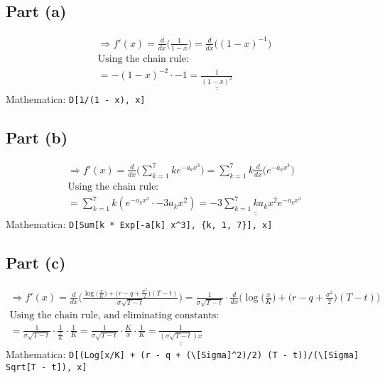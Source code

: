 \documentclass[letterpaper,10pt]{article}
\newcommand{\doubleu}[1]{\underline{\underline{#1}}}
\newcommand{\ddx}[1]{\frac{d}{dx} \bigg( #1 \bigg)}
\newcommand{\mathematica}[1]{Mathematica: \texttt{#1}}
\begin{document}
		\subsection{Part (a)}
			\begin{gather*}
				\Rightarrow f'(x) = \ddx{\frac{1}{1-x}}
				= \ddx{(1-x)^{-1}} \\
				\text{Using the chain rule:} \\
				= -(1-x)^{-2} \cdot -1 = \doubleu{\frac{1}{(1-x)^2}}
			\end{gather*}
			\mathematica{D[1/(1 - x), x]}

		\subsection{Part (b)}
			\begin{gather*}
				\Rightarrow f'(x) = \ddx{\sum_{k=1}^{7} k e^{-a_kx^3}}
				= \sum_{k=1}^{7} k \ddx{e^{-a_kx^3}} \\
				\text{Using the chain rule:} \\
				= \sum_{k=1}^{7} k (e^{-a_kx^3} \cdot -3a_kx^2)
				= \doubleu{-3 \sum_{k=1}^{7} ka_kx^2e^{-a_kx^3}}
			\end{gather*}
			\mathematica{D[Sum[k * Exp[-a[k] x\^{}3], \{k, 1, 7\}], x]}

		\subsection{Part (c)}
			\begin{gather*}
				\Rightarrow f'(x) = \ddx{\frac{\log \big(\frac{x}{K}\big) + \Big(r - q + \frac{\sigma^2}{2}\Big)(T-t)}{\sigma\sqrt{T-t}}}
				= \frac{1}{\sigma\sqrt{T-t}} \cdot \ddx{\log \big(\frac{x}{K}\big) + \Big(r - q + \frac{\sigma^2}{2}\Big)(T-t)} \\
				\text{Using the chain rule, and eliminating constants:} \\
				= \frac{1}{\sigma\sqrt{T-t}} \cdot \frac{1}{\frac{x}{K}} \cdot \frac{1}{K}
				= \frac{1}{\sigma\sqrt{T-t}} \cdot \frac{K}{x} \cdot \frac{1}{K}
				= \doubleu{\frac{1}{(\sigma\sqrt{T-t})x}}
			\end{gather*}
			\mathematica{D[(Log[x/K] + (r - q + (\textbackslash[Sigma]\^{}2)/2) (T - t))/(\textbackslash[Sigma] Sqrt[T - t]), x]}
\end{document}
